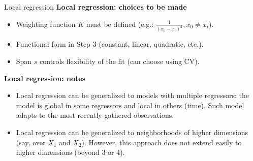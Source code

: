 \documentclass{beamer}
\begin{document}
\begin{frame}{Local regression}
\textbf{Local regression: choices to be made}\\
\smallskip
\begin{itemize}
    \item Weighting function $K$ must be defined (e.g.: $\tfrac{1}{(x_0 - x_i)^2}, x_0 \neq x_i$).
    \smallskip
    \item Functional form in Step 3 (constant, linear, quadratic, etc.).
    \smallskip
    \item Span $s$ controls flexibility of the fit (can choose using CV).
\end{itemize}
\bigskip
\textbf{Local regression: notes}\\
\smallskip
\begin{itemize}
    \item Local regression can be generalized to models with multiple regressors: the model is global in some regressors and local in others (time). Such model adapts to the most recently gathered observations.
    \smallskip
    \item Local regression can be generalized to neighborhoods of higher dimensions (say, over $X_1$ and $X_2$). However, this approach does not extend easily to higher dimensions (beyond 3 or 4).
\end{itemize}
\end{frame}
\end{document}
